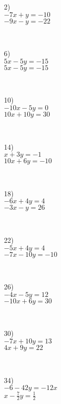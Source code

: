 \begin{multicols}{4}
  2)\\
  $- 7 x + y = - 10$\\
  $- 9 x - y = - 22$\par
  ~\par
  6)\\
  $5 x - 5 y = - 15$\\
  $5 x - 5 y = - 15$\par
  ~\par
  10)\\
  $- 10 x - 5 y = 0$\\
  $10 x +10 y=30$\par
  ~\par
  14)\\
  $x + 3 y = - 1$\\
  $10 x + 6 y = - 10$\par
  ~\par
  18)\\
  $- 6 x + 4 y = 4$\\
  $- 3 x - y = 26$\par
  ~\par
  22)\\
  $- 5 x + 4 y = 4$\\
  $- 7 x - 10 y = - 10$\par
  ~\par
  26)\\
  $- 4 x - 5 y = 12$\\
  $- 10 x + 6 y = 30$\par
  ~\par
  30)\\
  $- 7 x + 10 y = 13$\\
  $4 x + 9 y = 22$\par
  ~\par
  34)\\
  $- 6 - 42 y = - 12 x$\\
	$x - \frac{7}{2} y = \frac{1}{2} $\par
  ~\par
	

\end{multicols}
